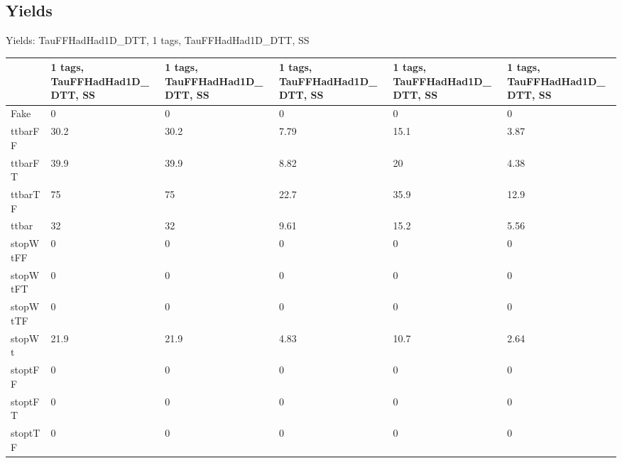 
\subsection{Yields}

\begin{frame}{Yields: TauFFHadHad1D\_DTT, 1 tags, TauFFHadHad1D\_DTT, SS}
\begin{center}
  \begin{tabular}{l| >{\centering\let\newline\\\arraybackslash\hspace{0pt}}m{1.4cm}| >{\centering\let\newline\\\arraybackslash\hspace{0pt}}m{1.4cm}| >{\centering\let\newline\\\arraybackslash\hspace{0pt}}m{1.4cm}| >{\centering\let\newline\\\arraybackslash\hspace{0pt}}m{1.4cm}| >{\centering\let\newline\\\arraybackslash\hspace{0pt}}m{1.4cm}}
    & 1 tags, TauFFHadHad1D\_DTT, SS & 1 tags, TauFFHadHad1D\_DTT, SS & 1 tags, TauFFHadHad1D\_DTT, SS & 1 tags, TauFFHadHad1D\_DTT, SS & 1 tags, TauFFHadHad1D\_DTT, SS \\
 \hline \hline
    Fake& 0 & 0 & 0 & 0 & 0 \\
 \hline
    ttbarFF& 30.2 & 30.2 & 7.79 & 15.1 & 3.87 \\
 \hline
    ttbarFT& 39.9 & 39.9 & 8.82 & 20 & 4.38 \\
 \hline
    ttbarTF& 75 & 75 & 22.7 & 35.9 & 12.9 \\
 \hline
    ttbar& 32 & 32 & 9.61 & 15.2 & 5.56 \\
 \hline
    stopWtFF& 0 & 0 & 0 & 0 & 0 \\
 \hline
    stopWtFT& 0 & 0 & 0 & 0 & 0 \\
 \hline
    stopWtTF& 0 & 0 & 0 & 0 & 0 \\
 \hline
    stopWt& 21.9 & 21.9 & 4.83 & 10.7 & 2.64 \\
 \hline
    stoptFF& 0 & 0 & 0 & 0 & 0 \\
 \hline
    stoptFT& 0 & 0 & 0 & 0 & 0 \\
 \hline
    stoptTF& 0 & 0 & 0 & 0 & 0 \\

\end{tabular}
\end{center}
\end{frame}
